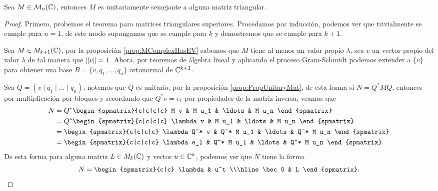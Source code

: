 \begin{teor}
  Sea $M \in\mathcal{M}_n(\mathbb{C})$, entonces $M$ es unitariamente semejante a alguna matriz triangular.
\end{teor}
\begin{proof}
  Primero, probemos el teorema para matrices triangulares superiores. Procedamos por inducción, podemos ver que trivialmente se cumple para $n = 1$, de este modo supongamos que se cumple para $k$ y demostremos que se cumple para $k+1$.
  
  Sea $M \in M_{k+1}(\mathbb{C})$, por la proposición \ref{prop:MComplexHasEV} sabemos que $M$ tiene al menos un valor propio $\lambda$, sea $v$ un vector propio del valor $\lambda$ de tal manera que $\mathopen\|v\mathclose\|=1$. Ahora, por teoremas de álgebra lineal y aplicando el proceso Gram-Schmidt podemos extender a $\{v\}$ para obtener una base $B = \{ v, q_1, \ldots, q_n \}$ ortonormal de $\mathbb{C}^{k+1}$.
  
  Sea $Q = ( v \mid  q_1 \mid \ldots \mid q_n  ) $, notemos que $Q$ es unitario, por la proposición \ref{prop:PropUnitaryMat}, de esta forma si $N = Q^* M Q$, entonces por multiplicación por bloques y recordando que $Q^*v = e_1$ por propiedades de la matriz inversa, veamos que
  \begin{align*}
      N &= Q^* \begin{spmatrix}{c|c|c|c} M v &  M u_1 & \ldots & M u_n  \end{spmatrix} \\
        &= Q^* \begin{spmatrix}{c|c|c|c} \lambda v &  M u_1 & \ldots & M u_n  \end{spmatrix} \\
        &= \begin{spmatrix}{c|c|c|c} \lambda Q^* v  &  Q^* M u_1 & \ldots & Q^* M u_n  \end{spmatrix} \\
        &= \begin{spmatrix}{c|c|c|c} \lambda e_1 &  Q^* M u_1 & \ldots & Q^* M u_n  \end{spmatrix}.
  \end{align*}
  De esta forma para alguna matriz $L \in M_k(\mathbb{C})$ y vector $u \in \mathbb{C}^k$, podemos ver que $N$ tiene la forma
  \[
  N = \begin{spmatrix}{c|c} \lambda & u^t \\\hline \bec 0 & L \end{spmatrix}.
  \]
  

\end{proof}
